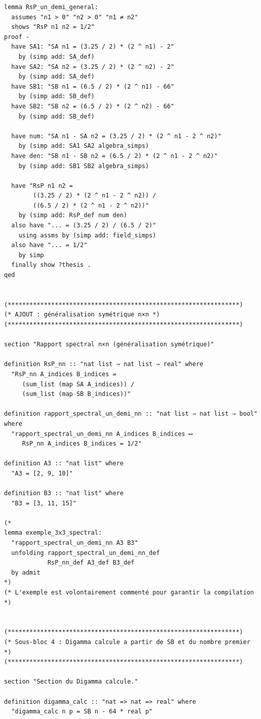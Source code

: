 \documentclass[a4paper,11pt]{article}
\begin{document}
\begin{holcode}[title={\textcolor{white}{File: methode\_spectral.thy -- Part 1/4}}]
\begin{lstlisting}
lemma RsP_un_demi_general:
  assumes "n1 > 0" "n2 > 0" "n1 ≠ n2"
  shows "RsP n1 n2 = 1/2"
proof -
  have SA1: "SA n1 = (3.25 / 2) * (2 ^ n1) - 2"
    by (simp add: SA_def)
  have SA2: "SA n2 = (3.25 / 2) * (2 ^ n2) - 2"
    by (simp add: SA_def)
  have SB1: "SB n1 = (6.5 / 2) * (2 ^ n1) - 66"
    by (simp add: SB_def)
  have SB2: "SB n2 = (6.5 / 2) * (2 ^ n2) - 66"
    by (simp add: SB_def)

  have num: "SA n1 - SA n2 = (3.25 / 2) * (2 ^ n1 - 2 ^ n2)"
    by (simp add: SA1 SA2 algebra_simps)
  have den: "SB n1 - SB n2 = (6.5 / 2) * (2 ^ n1 - 2 ^ n2)"
    by (simp add: SB1 SB2 algebra_simps)

  have "RsP n1 n2 =
        ((3.25 / 2) * (2 ^ n1 - 2 ^ n2)) /
        ((6.5 / 2) * (2 ^ n1 - 2 ^ n2))"
    by (simp add: RsP_def num den)
  also have "... = (3.25 / 2) / (6.5 / 2)"
    using assms by (simp add: field_simps)
  also have "... = 1/2"
    by simp
  finally show ?thesis .
qed


(****************************************************************)
(* AJOUT : généralisation symétrique n×n *)
(****************************************************************)

section "Rapport spectral n×n (généralisation symétrique)"

definition RsP_nn :: "nat list ⇒ nat list ⇒ real" where
  "RsP_nn A_indices B_indices =
     (sum_list (map SA A_indices)) /
     (sum_list (map SB B_indices))"

definition rapport_spectral_un_demi_nn :: "nat list ⇒ nat list ⇒ bool" where
  "rapport_spectral_un_demi_nn A_indices B_indices ⟷
     RsP_nn A_indices B_indices = 1/2"

definition A3 :: "nat list" where
  "A3 = [2, 9, 10]"

definition B3 :: "nat list" where
  "B3 = [3, 11, 15]"

(*
lemma exemple_3x3_spectral:
  "rapport_spectral_un_demi_nn A3 B3"
  unfolding rapport_spectral_un_demi_nn_def
            RsP_nn_def A3_def B3_def
  by admit
*)
(* L'exemple est volontairement commenté pour garantir la compilation *)


(****************************************************************)
(* Sous-bloc 4 : Digamma calcule a partir de SB et du nombre premier *)
(****************************************************************)

section "Section du Digamma calcule."

definition digamma_calc :: "nat => nat => real" where
  "digamma_calc n p = SB n - 64 * real p"


\end{lstlisting}
\end{holcode}
\end{document}
